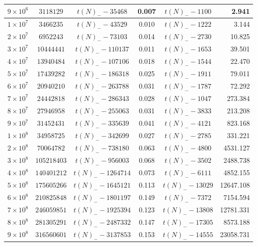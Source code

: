 \documentclass[10pt,a4paper,reqno]{amsart}
\numberwithin{equation}{section}
\theoremstyle{plain}
\theoremstyle{definition}
\begin{document}
\begin{table}[htp!]
\begin{tabular}{|c|c|c|c|c|r|}
$9 \times 10^6$ & $\num{3118129}$ & $t(N)_- - \num{35468}$ & 0.007 & $t(N)_- - \num{1100}$ & 2.941 \\\hline
\rule{0pt}{12pt}$1 \times 10^7$ & $\num{3466235}$ & $t(N)_- - \num{43529}$ & 0.010 & $t(N)_- - \num{1222}$ & 3.144 \\
$2 \times 10^7$ & $\num{6952243}$ & $t(N)_- - \num{73103}$ & 0.014 & $t(N)_- - \num{2730}$ & 10.825 \\
$3 \times 10^7$ & $\num{10444441}$ & $t(N)_- - \num{110137}$ & 0.011 & $t(N)_- - \num{1653}$ & 39.501 \\
$4 \times 10^7$ & $\num{13940484}$ & $t(N)_- - \num{107106}$ & 0.018 & $t(N)_- - \num{1544}$ & 22.470 \\
$5 \times 10^7$ & $\num{17439282}$ & $t(N)_- - \num{186318}$ & 0.025 & $t(N)_- - \num{1911}$ & 79.011 \\
$6 \times 10^7$ & $\num{20940210}$ & $t(N)_- - \num{263788}$ & 0.031 & $t(N)_- - \num{1787}$ & 72.292 \\
$7 \times 10^7$ & $\num{24442818}$ & $t(N)_- - \num{286343}$ & 0.028 & $t(N)_- - \num{1047}$ & 273.384 \\
$8 \times 10^7$ & $\num{27946958}$ & $t(N)_- - \num{255063}$ & 0.031 & $t(N)_- - \num{3833}$ & 213.208 \\
$9 \times 10^7$ & $\num{31452431}$ & $t(N)_- - \num{335639}$ & 0.041 & $t(N)_- - \num{4121}$ & 823.168 \\\hline
\rule{0pt}{12pt}$1 \times 10^8$ & $\num{34958725}$ & $t(N)_- - \num{342699}$ & 0.027 & $t(N)_- - \num{2785}$ & 331.221 \\
$2 \times 10^8$ & $\num{70064782}$ & $t(N)_- - \num{738180}$ & 0.063 & $t(N)_- - \num{4800}$ & 4531.127 \\
$3 \times 10^8$ & $\num{105218403}$ & $t(N)_- - \num{956003}$ & 0.068 & $t(N)_- - \num{3502}$ & 2488.738 \\
$4 \times 10^8$ & $\num{140401212}$ & $t(N)_- - \num{1264714}$ & 0.073 & $t(N)_- - \num{6111}$ & 4852.155 \\
$5 \times 10^8$ & $\num{175605266}$ & $t(N)_- - \num{1645121}$ & 0.113 & $t(N)_- - \num{13029}$ & 12647.108 \\
$6 \times 10^8$ & $\num{210825848}$ & $t(N)_- - \num{1801197}$ & 0.149 & $t(N)_- - \num{7372}$ & 7154.594 \\
$7 \times 10^8$ & $\num{246059851}$ & $t(N)_- - \num{1925394}$ & 0.123 & $t(N)_- - \num{13808}$ & 12781.331 \\
$8 \times 10^8$ & $\num{281305291}$ & $t(N)_- - \num{2487332}$ & 0.147 & $t(N)_- - \num{17305}$ & 8573.188 \\
$9 \times 10^8$ & $\num{316560601}$ & $t(N)_- - \num{3137853}$ & 0.153 & $t(N)_- - \num{14555}$ & 23058.731 \\\hline
\end{tabular}
\bigskip


\end{table}
\end{document}
